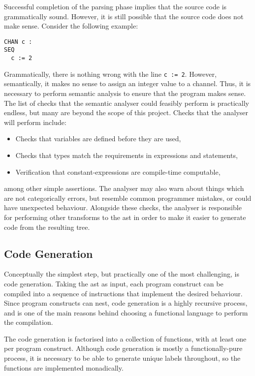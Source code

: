 Successful completion of the parsing phase implies that the source code is
grammatically sound. However, it is still possible that the source code does not
make sense. Consider the following example:
\begin{lstlisting}[language=occam]
CHAN c :
SEQ
  c := 2
\end{lstlisting}
Grammatically, there is nothing wrong with the line \texttt{c := 2}. However,
semantically, it makes no sense to assign an integer value to a channel. Thus,
it is necessary to perform semantic analysis to ensure that the program makes
sense. The list of checks that the semantic analyser could feasibly perform is
practically endless, but many are beyond the scope of this project. Checks that
the analyser will perform include:
\begin{itemize}
  \item Checks that variables are defined before they are used,
  \item Checks that types match the requirements in expressions and statements,
  \item Verification that constant-expressions are compile-time computable,
\end{itemize}
among other simple assertions. The analyser may also warn about things which are
not categorically errors, but resemble common programmer mistakes, or could have
unexpected behaviour. Alongside these checks, the analyser is responsible for
performing other transforms to the \gls{ast} in order to make it easier to
generate code from the resulting tree.

\subsection{Code Generation}

Conceptually the simplest step, but practically one of the most challenging,
is code generation. Taking the \gls{ast} as input, each program construct can be
compiled into a sequence of instructions that implement the desired behaviour.
Since program constructs can nest, code generation is a highly recursive
process, and is one of the main reasons behind choosing a functional language to
perform the compilation.

The code generation is factorised into a collection of functions, with at least
one per program construct. Although code generation is mostly a
functionally-pure process, it is necessary to be able to generate unique labels
throughout, so the functions are implemented monadically.

